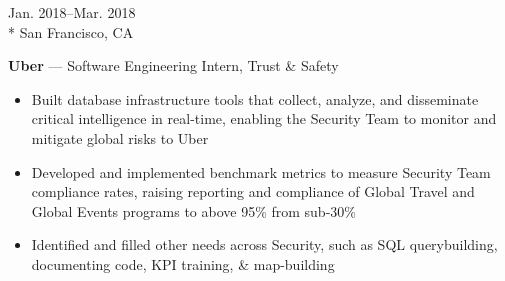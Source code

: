 \documentclass[a4paper,9pt]{article}
\begin{document}
\vspace{-3ex}
\begin{minipage}[t]{0.20\linewidth}
	\begin{small}
		\begin{spacing}{1.10}
			\begin{flushright}
				Jan. 2018--Mar. 2018
				\\*
				\vspace*{2.5pt}
				San Francisco, CA
			\end{flushright}
		\end{spacing}
	\end{small}
\end{minipage}
\hspace{4mm}
\begin{minipage}[t]{0.75\linewidth}
	\begin{small}
		\begin{spacing}{1.10}
			\begin{flushleft}
				\textbf{Uber} --- Software Engineering Intern, Trust \& Safety
				\begin{itemize}[itemsep=0pt,topsep=2.5pt,leftmargin=*]
					\item Built database infrastructure tools that collect, analyze, and disseminate critical intelligence in real-time, enabling the Security Team to monitor and mitigate global risks to Uber
					\item Developed and implemented benchmark metrics to measure Security Team compliance rates, raising reporting and compliance of Global Travel and Global Events programs to above 95\% from sub-30\%
					\item Identified and filled other needs across Security, such as SQL querybuilding, documenting code, KPI training, \& map-building
				\end{itemize}
			\end{flushleft}
		\end{spacing}
	\end{small}
\end{minipage}
\end{document}

